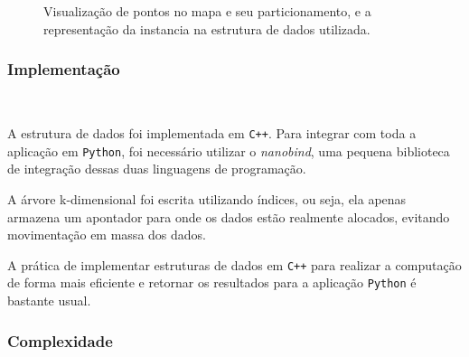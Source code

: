 \documentclass{article}
\begin{document}
\begin{adjustwidth}{-1.5cm}{-1.5cm}
\begin{figure}[h!]
\caption{Visualização de pontos no mapa  e seu particionamento, e a representação da instancia na estrutura de dados utilizada.}
\end{figure}

\subsubsection{Implementação}
\

A estrutura de dados foi implementada em \texttt{C++}. Para integrar com toda a aplicação em \texttt{Python}, foi necessário utilizar o \textit{nanobind}, uma pequena biblioteca de integração dessas duas linguagens de programação.

A árvore k-dimensional foi escrita utilizando índices, ou seja, ela apenas armazena um apontador para onde os dados estão realmente alocados, evitando movimentação em massa dos dados.

A prática de implementar estruturas de dados em \texttt{C++} para realizar a computação de forma mais eficiente e retornar os resultados para a aplicação \texttt{Python} é bastante usual.



\subsubsection{Complexidade}
\


\end{adjustwidth}
\end{document}
